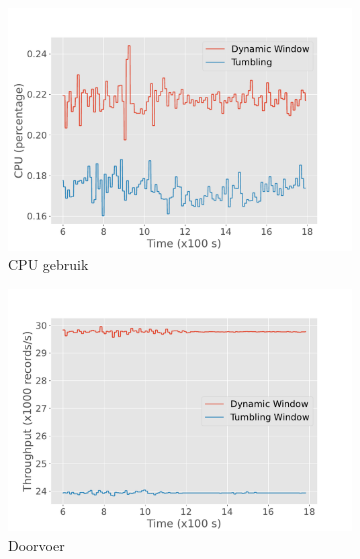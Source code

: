 \begin{figure}
    \begin{subfigure}[b]{0.5\columnwidth}
        \includegraphics[width=\columnwidth]{fig/periodic/cpu_comparison.pdf}
        \caption{CPU gebruik}
        \label{fig:periodic_cpu}
    \end{subfigure}
    \hfill 
    \begin{subfigure}[b]{0.5\columnwidth}
        \includegraphics[width=\columnwidth]{fig/periodic/throughput_comparison.pdf}
        \caption{Doorvoer}
        \label{fig:periodic_throughput}
    \end{subfigure}
    \begin{subfigure}[b]{0.5\columnwidth}

\end{subfigure}
\end{figure}
